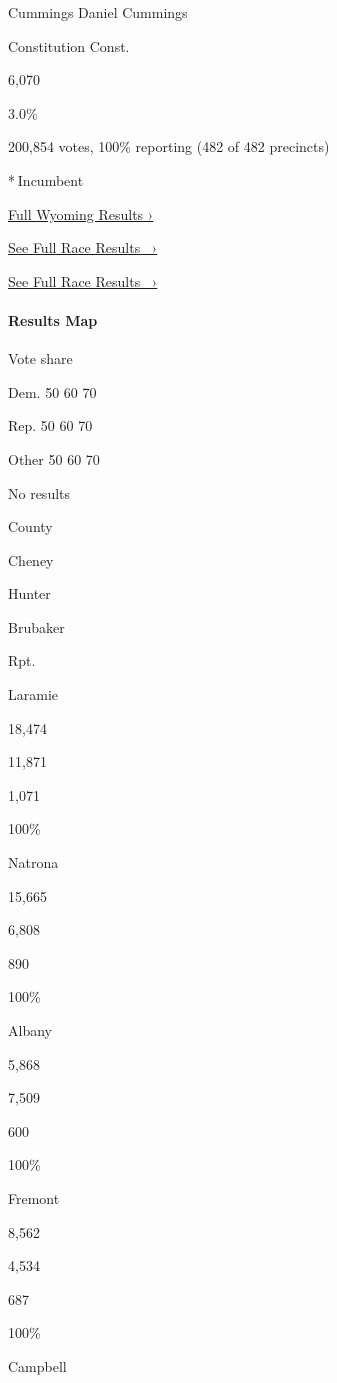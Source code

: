  Cummings Daniel Cummings

Constitution Const.

6,070

3.0\%

200,854 votes, 100\% reporting (482 of 482 precincts)

* Incumbent

\href{https://www.nytimes3xbfgragh.onion/interactive/2018/11/06/us/elections/results-wyoming-elections.html}{Full
Wyoming Results ›}

\href{https://www.nytimes3xbfgragh.onion/elections/results/wyoming-house-district-at-large}{See
Full Race Results~ ›}

\href{https://www.nytimes3xbfgragh.onion/elections/results/wyoming-house-district-at-large}{See
Full Race Results~ ›}

\hypertarget{results-map-1}{%
\paragraph{Results Map}\label{results-map-1}}

Vote share

Dem. 50 60 70

Rep. 50 60 70

Other 50 60 70

No results

County

Cheney

Hunter

Brubaker

Rpt.

Laramie

18,474

11,871

1,071

100\%

Natrona

15,665

6,808

890

100\%

Albany

5,868

7,509

600

100\%

Fremont

8,562

4,534

687

100\%

Campbell

